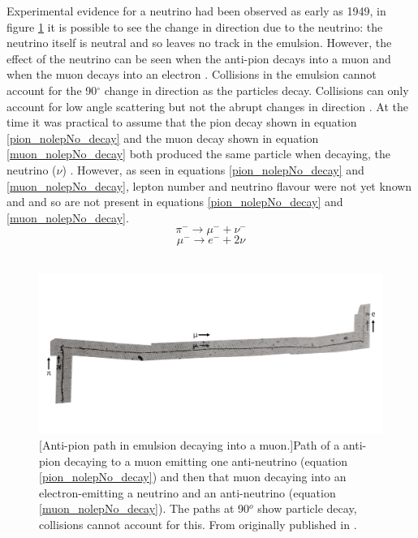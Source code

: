 Experimental evidence for a neutrino had been observed as early as 1949, in figure \ref{pion_path} it is possible to see the change in direction due to the neutrino: the neutrino itself is neutral and so leaves no track in the emulsion. However, the effect of the neutrino can be seen when the anti-pion decays into a muon and when the muon decays into an electron  \cite{griffiths2008neutrino1.5}. Collisions in the emulsion cannot account for the 90$^\circ$ change in direction as the particles decay. Collisions can only account for low angle scattering but not the abrupt changes in direction  \cite{griffiths2008neutrino1.5}. At the time it was practical to assume that the pion decay shown in equation \ref{pion_nolepNo_decay} and the muon decay shown in equation \ref{muon_nolepNo_decay} both produced the same particle when decaying, the neutrino ($\nu$)  \cite{griffiths2008neutrino1.5}. However, as seen in equations \ref{pion_nolepNo_decay} and \ref{muon_nolepNo_decay}, lepton number and neutrino flavour were not yet known and and so are not present in equations \ref{pion_nolepNo_decay} and \ref{muon_nolepNo_decay}.
\begin{equation}
    \pi^- \rightarrow \mu^- + \nu^-
    \label{pion_nolepNo_decay}
\end{equation}
\begin{equation}
    \mu^- \rightarrow e^- + 2\nu
    \label{muon_nolepNo_decay}
\end{equation}
\\
\begin{figure}[!h]
 \centering
 \includegraphics[width=0.8\linewidth]{Chapter1/Figs/Raster/neutrinoInChamberRotated90.png}
 [Anti-pion path in emulsion decaying into a muon.]{Path of a anti-pion decaying to a muon emitting one anti-neutrino (equation \ref{pion_nolepNo_decay}) and then that muon decaying into an electron-emitting a neutrino and an anti-neutrino (equation \ref{muon_nolepNo_decay}). The paths at 90$^o$ show particle decay, collisions cannot account for this. From \cite{griffiths2008neutrino1.5} originally published in \cite{michel1949energy}.} %
 \label{pion_path}
\end{figure}
